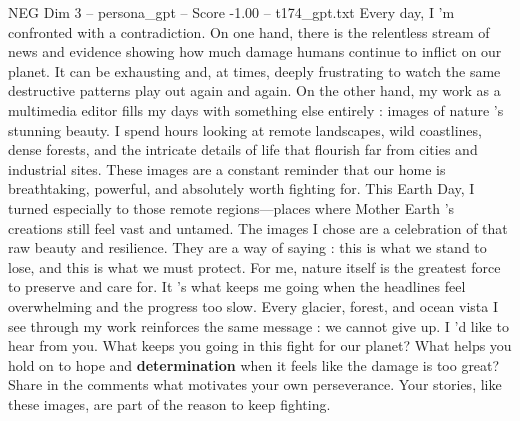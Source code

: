 \begin{textsample}{NEG Dim 3 – persona\_gpt – Score -1.00 – t174\_gpt.txt}  \label{ex:f3_neg_035}
Every day, I ’m confronted with a contradiction.
On one hand, there is the relentless stream of news and evidence showing how much damage humans continue to inflict on our planet.
It can be exhausting and, at times, deeply frustrating to watch the same destructive patterns play out again and again.
On the other hand, my work as a multimedia editor fills my days with something else entirely : images of nature ’s stunning beauty.
I spend hours looking at remote landscapes, wild coastlines, dense forests, and the intricate details of life that flourish far from cities and industrial sites.
These images are a constant reminder that our home is breathtaking, powerful, and absolutely worth fighting for.
This Earth Day, I turned especially to those remote regions—places where Mother Earth ’s creations still feel vast and untamed.
The images I chose are a celebration of that raw beauty and resilience.
They are a way of saying : this is what we stand to lose, and this is what we must protect.
For me, nature itself is the greatest force to preserve and care for.
It ’s what keeps me going when the headlines feel overwhelming and the progress too slow.
Every glacier, forest, and ocean vista I see through my work reinforces the same message : we cannot give up.
I ’d like to hear from you.
What keeps you going in this fight for our planet?
What helps you hold on to hope and \textbf{determination} when it feels like the damage is too great?
Share in the comments what motivates your own perseverance.
Your stories, like these images, are part of the reason to keep fighting.

\end{textsample}
